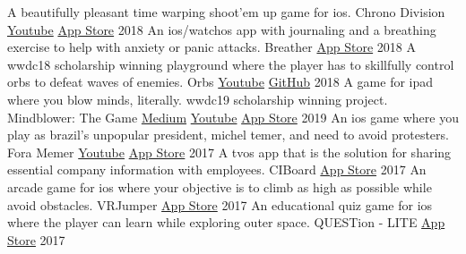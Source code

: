 

\begin{cventries}
  \cvcompactentry
    {A beautifully pleasant time warping shoot'em up game for ios.}
    {Chrono Division}
    {\href{https://www.youtube.com/watch?v=Wc9-ALdmvRw}{Youtube} \hspace{4pt} \href{https://itunes.apple.com/app/id1437675179}{App Store}}
    {2018}
  \cvcompactentry
    {An ios/watchos app with journaling and a breathing exercise to help with anxiety or panic attacks.}
    {Breather}
    {\href{https://itunes.apple.com/app/id1370659046}{App Store}}
    {2018}
  \cvcompactentry
    {A wwdc18 scholarship winning playground where the player has to skillfully control orbs to defeat waves of enemies.}
    {Orbs}
    {\href{https://www.youtube.com/watch?v=W-tzS0x1SiA}{Youtube} \hspace{4pt} \href{https://github.com/renanmagagnin/orbs-wwdc18}{GitHub}}
    {2018}
  \cvcompactentry
    {A game for ipad where you blow minds, literally. wwdc19 scholarship winning project.}
    {Mindblower: The Game}
    {\href{https://medium.freecodecamp.org/how-i-won-a-scholarship-to-apples-yearly-event-for-the-second-time-f04f5f4636b1}{Medium} \hspace{4pt} \href{https://www.youtube.com/watch?v=xH9cn7BtG8k}{Youtube} \hspace{4pt} \href{https://itunes.apple.com/us/app/mindblower-the-game/id1460079689}{App Store}} %
    {2019}
  \cvcompactentry
    {An ios game where you play as brazil's unpopular president, michel temer, and need to avoid protesters.}
    {Fora Memer}
    {\href{https://youtu.be/YwVg7Yuu3pY}{Youtube} \hspace{4pt} \href{https://itunes.apple.com/br/app/fora-memer/id1253655537}{App Store}}
    {2017}
  \cvcompactentry
    {A tvos app that is the solution for sharing essential company information with employees.}
    {CIBoard}
    {\href{https://itunes.apple.com/app/id1293364926}{App Store}}
    {2017}
  \cvcompactentry
    {An arcade game for ios where your objective is to climb as high as possible while avoid obstacles.}
    {VRJumper}
    {\href{https://itunes.apple.com/app/id1262625055}{App Store}}
    {2017}
  \cvcompactentry
    {An educational quiz game for ios where the player can learn while exploring outer space.}
    {QUESTion - LITE}
    {\href{https://itunes.apple.com/app/id1233411790}{App Store}}
    {2017}
\end{cventries}
